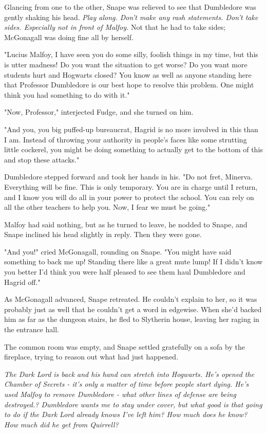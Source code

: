 Glancing from one to the other, Snape was relieved to see that Dumbledore was gently shaking his head. \emph{Play along. Don't make any rash statements. Don't take sides. Especially not in front of Malfoy.} Not that he had to take sides; McGonagall was doing fine all by herself.

"Lucius Malfoy, I have seen you do some silly, foolish things in my time, but this is utter madness! Do you want the situation to get worse? Do you want more students hurt and Hogwarts closed? You know as well as anyone standing here that Professor Dumbledore is our best hope to resolve this problem. One might think you had something to do with it."

"Now, Professor," interjected Fudge, and she turned on him.

"And you, you big puffed-up bureaucrat, Hagrid is no more involved in this than I am. Instead of throwing your authority in people's faces like some strutting little cockerel, you might be doing something to actually get to the bottom of this and stop these attacks."

Dumbledore stepped forward and took her hands in his. "Do not fret, Minerva. Everything will be fine. This is only temporary. You are in charge until I return, and I know you will do all in your power to protect the school. You can rely on all the other teachers to help you. Now, I fear we must be going."

Malfoy had said nothing, but as he turned to leave, he nodded to Snape, and Snape inclined his head slightly in reply. Then they were gone.

"And you!" cried McGonagall, rounding on Snape. "You might have said something to back me up! Standing there like a great mute lump! If I didn't know you better I'd think you were half pleased to see them haul Dumbledore and Hagrid off."

As McGonagall advanced, Snape retreated. He couldn't explain to her, so it was probably just as well that he couldn't get a word in edgewise. When she'd backed him as far as the dungeon stairs, he fled to Slytherin house, leaving her raging in the entrance hall.

The common room was empty, and Snape settled gratefully on a sofa by the fireplace, trying to reason out what had just happened.

\emph{The Dark Lord is back and his hand can stretch into Hogwarts. He's opened the Chamber of Secrets - it's only a matter of time before people start dying. He's used Malfoy to remove Dumbledore - what other lines of defense are being destroyed.? Dumbledore wants me to stay under cover, but what good is that going to do if the Dark Lord already knows I've left him? How much does he know? How much did he get from Quirrell?}

